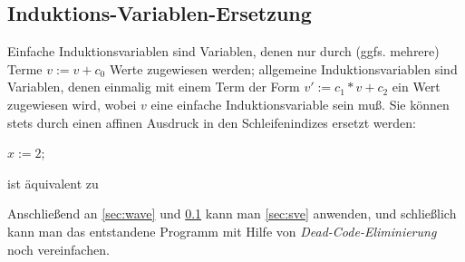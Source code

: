 \subsection{Induktions-Variablen-Ersetzung}
\label{sec:ive}

Einfache Induktionsvariablen sind Variablen, denen nur durch (ggfs.
mehrere) Terme $v := v + c_0$ Werte zugewiesen werden; allgemeine
Induktionsvariablen sind Variablen, denen einmalig mit einem Term der
Form $v':= c_1*v + c_2$ ein Wert zugewiesen wird, wobei $v$ eine
einfache Induktionsvariable sein muß.  Sie können stets durch einen
affinen Ausdruck in den Schleifenindizes
ersetzt werden:\\

\begin{minipage}[c]{4cm}
    \begin{algorithm}[H]
        \( x:= 2 \);\\
    \end{algorithm}
\end{minipage}
%
\begin{minipage}[c]{4cm}
\centerline{ist äquivalent zu}
\end{minipage}
%
\begin{minipage}[c]{4cm}
    \begin{algorithm}[H]
    \end{algorithm}
\end{minipage}

\bigskip
Anschließend an \ref{sec:wave} und \ref{sec:ive} kann man \ref{sec:sve}
anwenden, und schließlich kann man das entstandene Programm mit Hilfe von
\emph{Dead-Code-Eliminierung} noch vereinfachen.